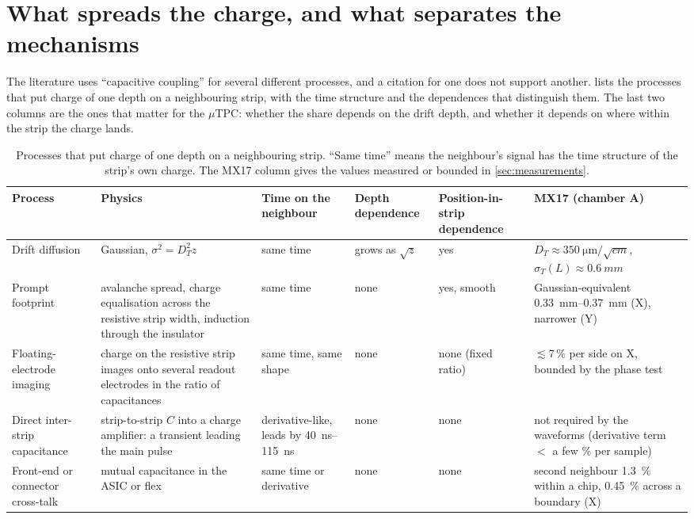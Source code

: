 \section{What spreads the charge, and what separates the mechanisms}\label{sec:mechanisms}

The literature uses ``capacitive coupling'' for several different processes, and a citation for one does not support another.
 lists the processes that put charge of one depth on a neighbouring strip, with the time structure and the
dependences that distinguish them. The last two columns are the ones that matter for the $\mu$TPC: whether the share depends on
the drift depth, and whether it depends on where within the strip the charge lands.

\begin{table}[t]
  \centering\footnotesize
  \caption{Processes that put charge of one depth on a neighbouring strip. ``Same time'' means the neighbour's signal has the
  time structure of the strip's own charge. The MX17 column gives the values measured or bounded in \cref{sec:measurements}.}
  \label{tab:mechanisms}
  \begin{tabular}{@{}p{2.9cm}p{3.3cm}p{1.9cm}p{1.7cm}p{1.7cm}p{2.9cm}@{}}
    \toprule
    Process & Physics & Time on the neighbour & Depth dependence & Position-in-strip dependence & MX17 (chamber A) \\
    \midrule
    Drift diffusion & Gaussian, $\sigma^2 = D_T^2 z$ & same time & grows as $\sqrt{z}$ & yes & $D_T \approx \SI{350}{\micro\metre\per\sqrt{cm}}$, $\sigma_T(L) \approx \SI{0.6}{mm}$ \\
    Prompt footprint & avalanche spread, charge equalisation across the resistive strip width, induction through the insulator & same time & none & yes, smooth & Gaussian-equivalent \SIrange{0.33}{0.37}{mm} (X), narrower (Y) \\
    Floating-electrode imaging & charge on the resistive strip images onto several readout electrodes in the ratio of capacitances & same time, same shape & none & none (fixed ratio) & $\lesssim 7\,\%$ per side on X, bounded by the phase test \\
    Direct inter-strip capacitance & strip-to-strip $C$ into a charge amplifier: a transient leading the main pulse & derivative-like, leads by \SIrange{40}{115}{ns} & none & none & not required by the waveforms (derivative term $<$ a few \% per sample) \\
    Front-end or connector cross-talk & mutual capacitance in the ASIC or flex & same time or derivative & none & none & second neighbour \SI{1.3}{\%} within a chip, \SI{0.45}{\%} across a boundary (X) \\

\end{tabular}
\end{table}
